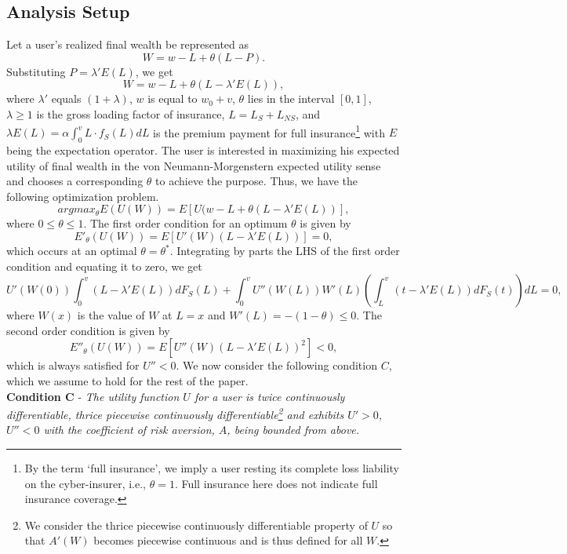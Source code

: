 \documentclass[letterpaper,12pt, onecolumn, nodraft]{IEEEtran}
\begin{document}
\subsection{Analysis Setup}
Let a user's realized final wealth be represented as
\begin{equation}
W = w - L + \theta(L - P).
\end{equation}
Substituting $P = \lambda'E(L)$, we get
\begin{equation}
W = w - L + \theta(L - \lambda' E(L)),
\end{equation}
where $\lambda'$ equals $(1 + \lambda)$, $w$ is equal to $w_{0} + v$, $\theta$ lies in the interval $[0,1]$, $\lambda \ge 1$ is the gross loading factor of insurance, $L = L_{S} + L_{NS}$, and $\lambda E(L) = \alpha \int_{0}^{v}L\cdot f_{S}(L)dL$ is the premium payment for full insurance\footnote{By the term `full insurance', we imply a user resting its complete loss liability on the cyber-insurer, i.e., $\theta = 1$. Full insurance here does not indicate full insurance coverage.}  with $E$ being the expectation operator. The user is interested in maximizing his expected utility of final wealth in the von Neumann-Morgenstern expected utility sense and chooses a corresponding $\theta$ to achieve the purpose. Thus, we have the following optimization problem.
\[argmax_{\theta}E(U(W)) = E[U(w - L + \theta(L - \lambda' E(L))],\]
where $0 \le \theta \le 1$.
The first order condition for an optimum $\theta$ is given by
\begin{equation}
E'_{\theta}(U(W)) = E[U'(W)(L - \lambda' E(L))] = 0,
\end{equation}
which occurs at an optimal $\theta = \theta^{*}$. Integrating by parts the LHS of the first order condition and equating it to zero, we get
\begin{equation}
U'(W(0))\int_{0}^{v}(L - \lambda' E(L))dF_{S}(L) + \int_{0}^{v}U''(W(L))W'(L)\left(\int_{L}^{v}(t - \lambda' E(L))dF_{S}(t)\right) dL = 0,
\end{equation}
where $W(x)$ is the value of $W$ at $L = x$ and $W'(L) = -(1 - \theta) \le 0$.
The second order condition is given by
\begin{equation}
E''_{\theta}(U(W)) = E[U''(W)(L - \lambda' E(L))^{2}]  < 0,
\end{equation}
which is always satisfied for $U'' < 0$.  We now consider the following condition $C$, which we assume to hold for the rest of the paper.\\
\textbf{Condition C} - \emph{The utility function $U$ for a user is twice continuously differentiable, thrice piecewise  continuously differentiable\footnote{We consider the thrice piecewise continuously differentiable property of $U$ so that $A'(W)$ becomes piecewise continuous and is thus defined for all $W$.} and exhibits $U' > 0$, $U'' < 0$ with the coefficient of risk aversion, $A$, being bounded from above.}
\end{document}
